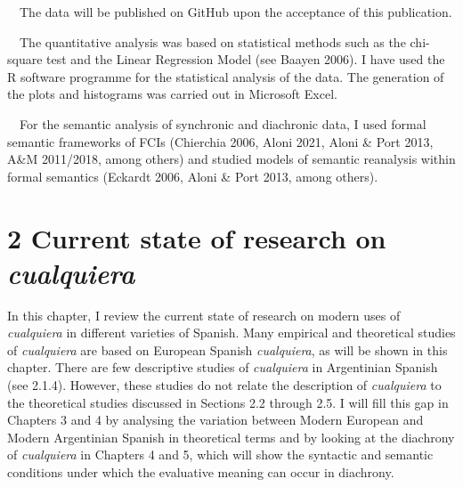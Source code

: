 \begin{styleStandard}
\ \ The data will be published on GitHub upon the acceptance of this publication.
\end{styleStandard}

\begin{styleStandard}
\ \ The quantitative analysis was based on statistical methods such as the chi-square test and the Linear Regression Model (see Baayen 2006). I have used the R software programme for the statistical analysis of the data. The generation of the plots and histograms was carried out in Microsoft Excel. 
\end{styleStandard}

\begin{styleStandard}
\ \ For the semantic analysis of synchronic and diachronic data, I used formal semantic frameworks of FCIs (Chierchia 2006, Aloni 2021, Aloni \& Port 2013, A\&M 2011/2018, among others) and studied models of semantic reanalysis within formal semantics (Eckardt 2006, Aloni \& Port 2013, among others).
\end{styleStandard}

\clearpage\section[2 Current state of research on cualquiera]{\textbf{2 Current state of research on }\textbf{\textit{cualquiera}}}
\begin{styleStandard}
In this chapter, I review the current state of research on modern uses of \textit{cualquiera} in different varieties of Spanish. Many empirical and theoretical studies of \textit{cualquiera} are based on European Spanish \textit{cualquiera}, as will be shown in this chapter. There are few descriptive studies of \textit{cualquiera} in Argentinian Spanish (see 2.1.4). However, these studies do not relate the description of \textit{cualquiera }to the theoretical studies discussed in Sections 2.2 through 2.5. I will fill this gap in Chapters 3 and 4 by analysing the variation between Modern European and Modern Argentinian Spanish in theoretical terms and by looking at the diachrony of \textit{cualquiera} in Chapters 4 and 5, which will show the syntactic and semantic conditions under which the evaluative meaning can occur in diachrony. 
\end{styleStandard}

